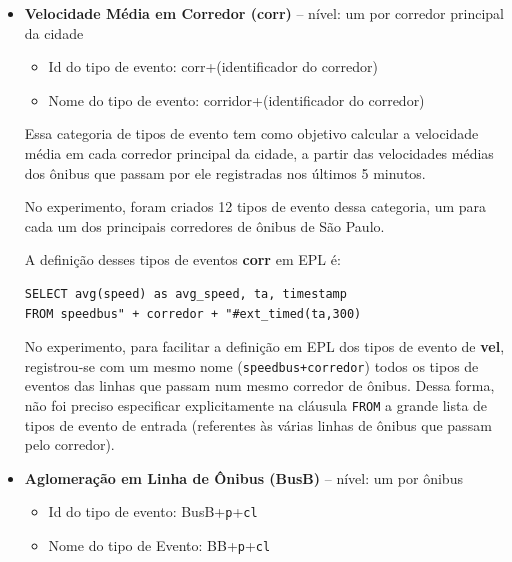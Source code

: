 \begin{itemize}

\item \textbf{Velocidade Média em Corredor (corr)} -- nível: um por corredor principal da cidade

\begin{itemize}
    \item Id do tipo de evento: corr+(identificador do corredor)
    \item Nome do tipo de evento: corridor+(identificador do corredor)
\end{itemize}


Essa categoria de tipos de evento tem como objetivo calcular a velocidade média em cada corredor principal da cidade, a partir das velocidades médias dos ônibus que passam por ele registradas nos últimos 5 minutos. 

No experimento, foram criados 12 tipos de evento dessa categoria, um para cada um dos principais corredores de ônibus de São Paulo.

A definição desses tipos de eventos \textbf{corr} em EPL é:
\begin{verbatim}
SELECT avg(speed) as avg_speed, ta, timestamp 
FROM speedbus" + corredor + "#ext_timed(ta,300)
\end{verbatim}

No experimento, para facilitar a definição em EPL dos tipos de evento de \textbf{vel}, registrou-se com um mesmo nome (\texttt{speedbus+corredor}) todos os tipos de eventos das linhas que passam num mesmo corredor de ônibus. Dessa forma, não foi preciso especificar explicitamente na cláusula \texttt{FROM} a grande lista de tipos de evento de entrada (referentes às várias linhas de ônibus que passam pelo corredor).

\item \textbf{Aglomeração em Linha de Ônibus (BusB)} -- nível: um por ônibus

\begin{itemize}
    \item Id do tipo de evento: BusB+\texttt{p}+\texttt{cl}
    \item Nome do tipo de Evento: BB+\texttt{p}+\texttt{cl}
\end{itemize}


\end{itemize}
